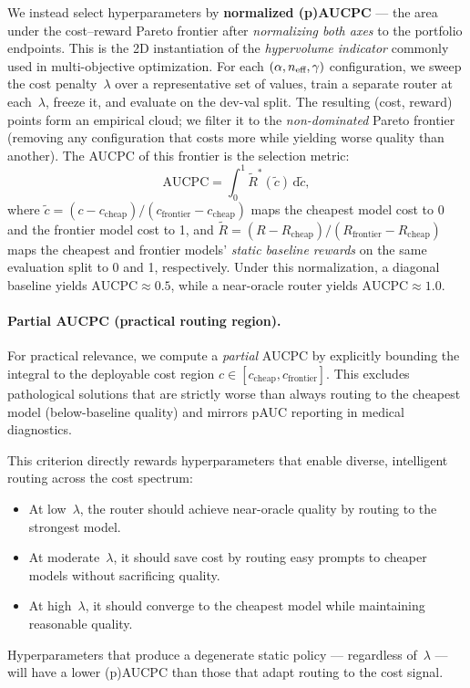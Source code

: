 We instead select hyperparameters by \textbf{normalized (p)AUCPC} --- the
area under the cost--reward Pareto frontier after \emph{normalizing both
axes} to the portfolio endpoints.  This is the 2D instantiation of the
\emph{hypervolume indicator} commonly used in multi-objective
optimization.  For each $(\alpha, n_{\text{eff}}, \gamma)$ configuration, we sweep
the cost penalty~$\lambda$ over a representative set of values, train a
separate router at each~$\lambda$, freeze it, and evaluate on the dev-val
split.  The resulting (cost, reward) points form an empirical cloud; we
filter it to the \emph{non-dominated} Pareto frontier (removing any
configuration that costs more while yielding worse quality than another).
The AUCPC of this frontier is the selection metric:
\[
    \text{AUCPC}
    = \int_{0}^{1} \tilde{R}^{*}(\tilde{c})\,\mathrm{d}\tilde{c},
\]
where $\tilde{c} = (c - c_{\text{cheap}}) / (c_{\text{frontier}} - c_{\text{cheap}})$
maps the cheapest model cost to 0 and the frontier model cost to 1, and
$\tilde{R} = (R - R_{\text{cheap}}) / (R_{\text{frontier}} - R_{\text{cheap}})$
maps the cheapest and frontier models' \emph{static baseline rewards} on
the same evaluation split to 0 and 1, respectively.  Under this
normalization, a diagonal baseline yields $\text{AUCPC}\approx 0.5$,
while a near-oracle router yields $\text{AUCPC}\approx 1.0$.

\paragraph{Partial AUCPC (practical routing region).}
For practical relevance, we compute a \emph{partial} AUCPC by explicitly
bounding the integral to the deployable cost region
$c \in [c_{\text{cheap}}, c_{\text{frontier}}]$.  This excludes
pathological solutions that are strictly worse than always routing to
the cheapest model (below-baseline quality) and mirrors pAUC reporting in
medical diagnostics.

This criterion directly rewards hyperparameters that enable diverse,
intelligent routing across the cost spectrum:
\begin{itemize}[leftmargin=*,noitemsep]
    \item At low~$\lambda$, the router should achieve near-oracle
          quality by routing to the strongest model.
    \item At moderate~$\lambda$, it should save cost by routing
          easy prompts to cheaper models without sacrificing quality.
    \item At high~$\lambda$, it should converge to the cheapest
          model while maintaining reasonable quality.
\end{itemize}
Hyperparameters that produce a degenerate static policy --- regardless
of~$\lambda$ --- will have a lower (p)AUCPC than those that adapt
routing to the cost signal.

